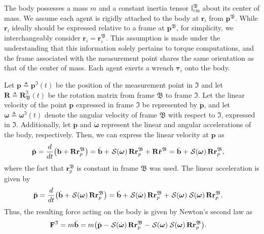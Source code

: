 The body possesses a mass $m$ and a constant inertia tensor $\mathbb{I}_\text{cm}^\mathfrak{B}$ about its center of mass. We assume each agent is rigidly attached to the body at $\mathbf{r}_i$ from $\mathbf{p}^\mathfrak{B}$. While $\mathbf{r}_i$ ideally should be expressed relative to a frame at $\mathbf{p}^\mathfrak{B}$, for simplicity, we interchangeably consider $\mathbf{r}_i= \mathbf{r}_i^\mathfrak{B}$. This assumption is made under the understanding that this information solely pertains to torque computations, and the frame associated with the measurement point shares the same orientation as that of the center of mass. Each agent exerts a wrench $\boldsymbol{\tau}_i$ onto the body.


Let $\mathbf{p}\triangleq\mathbf{p}^\mathfrak{I}(t)$ be the position of the measurement point in $\mathfrak{I}$ and let $\mathbf{R}\triangleq \mathbf{R}_\mathfrak{B}^\mathfrak{I}(t)$ be the rotation matrix from frame $\mathfrak{B}$ to frame $\mathfrak{I}$. Let the linear velocity of the point $\mathbf{p}$ expressed in frame $\mathfrak{I}$ be represented by $\dot{\mathbf{p}}$, and let $\boldsymbol{\omega}\triangleq\boldsymbol{\omega}^\mathfrak{I}(t)$ denote the angular velocity of frame $\mathfrak{B}$ with respect to $\mathfrak{I}$, expressed in $\mathfrak{I}$. Additionally, let $\ddot{\mathbf{p}}$ and $\dot{\boldsymbol{\omega}}$ represent the linear and angular accelerations of the body, respectively. Then, we can express the linear velocity at $\mathbf{p}$ as
\begin{align}
    \dot{\mathbf{p}} &= \frac{d}{dt}\bigl(\mathbf{b} + \mathbf{R}\mathbf{r}^\mathfrak{B}_p\bigr) 
    = \dot{\mathbf{b}} +\SL[\boldsymbol{\omega}]\mathbf{R}\mathbf{r}^\mathfrak{B}_p + \mathbf{R}\dot{\mathbf{r}}^\mathfrak{B} = \dot{\mathbf{b}} +\SL[\boldsymbol{\omega}]\mathbf{R}\mathbf{r}^\mathfrak{B}_p,
\end{align}
where the fact that $\mathbf{r}^\mathfrak{B}_p$ is constant in frame $\mathfrak{B}$ was used. The linear acceleration is given by
\begin{align}
    \ddot{\mathbf{p}} &= \frac{d}{dt}\bigl(\dot{\mathbf{b}} +\SL[\boldsymbol{\omega}]\mathbf{R}\mathbf{r}^\mathfrak{B}_p\bigr) 
    = \ddot{\mathbf{b}} + \SL[\dot{\boldsymbol{\omega}}]\mathbf{R}\mathbf{r}^\mathfrak{B}_p + \SL[\boldsymbol{\omega}]\SL[\boldsymbol{\omega}]\mathbf{R}\mathbf{r}^\mathfrak{B}_p.
\end{align}
Thus, the resulting force acting on the body is given by Newton's second law as
\begin{align}
    \mathbf{F}^\mathfrak{I}&=m\ddot{\mathbf{b}} = m\bigl(\ddot{\mathbf{p}} - \SL[\dot{\boldsymbol{\omega}}]\mathbf{R}\mathbf{r}^\mathfrak{B}_p - \SL[\boldsymbol{\omega}]\SL[\boldsymbol{\omega}]\mathbf{R}\mathbf{r}^\mathfrak{B}_p\bigr).
\end{align}
